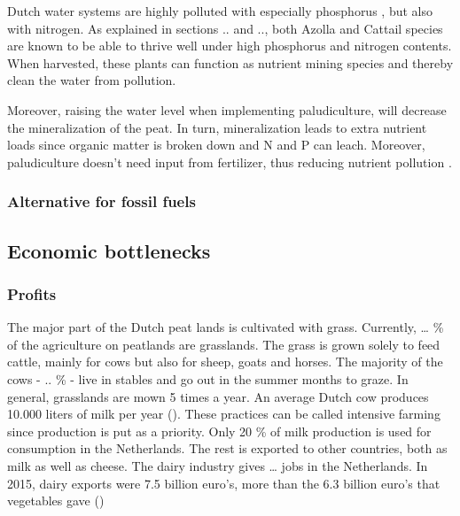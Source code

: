 \documentclass[12pt,a4paper,titlepage]{article}
\begin{document}
Dutch water systems are highly polluted with especially phosphorus \citep{}, but also with nitrogen. As explained in sections .. and .., both Azolla and Cattail species are known to be able to thrive well under high phosphorus and nitrogen contents. When harvested, these plants can function as nutrient mining species and thereby clean the water from pollution. 

Moreover, raising the water level when implementing paludiculture, will decrease the mineralization of the peat. In turn, mineralization leads to extra nutrient loads since organic matter is broken down and N and P can leach. Moreover, paludiculture doesn't need input from fertilizer, thus reducing nutrient pollution \citep{wichtmann2016paludiculture}.

\subsubsection{Alternative for fossil fuels}


\subsection{Economic bottlenecks}

\subsubsection{Profits}

The major part of the Dutch peat lands is cultivated with grass. Currently, … \% of the agriculture on peatlands are grasslands. The grass is grown solely to feed cattle, mainly for cows but also for sheep, goats and horses. The majority of the cows - .. \% - live in stables and go out in the summer months to graze. In general, grasslands are mown 5 times a year. An average Dutch cow produces 10.000 liters of milk per year (). These practices can be called intensive farming since production is put as a priority. Only 20 \% of milk production is used for consumption in the Netherlands. The rest is exported to other countries, both as milk as well as cheese. The dairy industry gives … jobs in the Netherlands. In 2015, dairy exports were 7.5 billion euro’s, more than the 6.3 billion euro’s that vegetables gave ()
\end{document}
